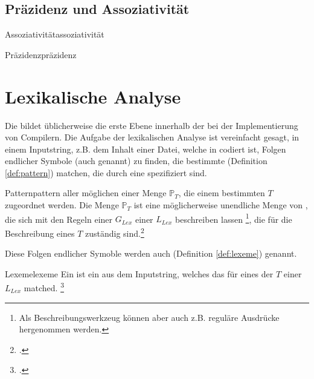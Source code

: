 \subsection{Präzidenz und Assoziativität}
\begin{Definition}{Assoziativität}{assoziativität}
\end{Definition}
\begin{Definition}{Präzidenz}{präzidenz}
\end{Definition}
\section{Lexikalische Analyse}
\label{sec:lexikalische_analyse}

Die  bildet üblicherweise die erste Ebene innerhalb der  bei der Implementierung von Compilern. Die Aufgabe der lexikalischen Analyse ist vereinfacht gesagt, in einem Inputstring, z.B. dem Inhalt einer Datei, welche in  codiert ist, Folgen endlicher Symbole (auch  genannt) zu finden, die bestimmte  (Definition \ref{def:pattern}) matchen, die durch eine  spezifiziert sind.

\begin{Definition}{Pattern}{pattern}
   aller möglichen  einer Menge $\mathbb{P}_{T}$, die einem bestimmten  $T$ zugeordnet werden.
  Die Menge $\mathbb{P}_{T}$ ist eine möglicherweise unendliche Menge von , die sich mit den Regeln einer  ${G}_{Lex}$ einer  ${L}_{Lex}$ beschreiben lassen \footnote{Als Beschreibungswerkzeug können aber auch z.B. reguläre Ausdrücke hergenommen werden.}, die für die Beschreibung eines  $T$ zuständig sind.\footcite{noauthor_what_nodate}
\end{Definition}

Diese Folgen endlicher Symoble werden auch  (Definition \ref{def:lexeme}) genannt.

\begin{Definition}{Lexeme}{lexeme}
  Ein  ist ein  aus dem Inputstring, welches das  für eines der  $T$ einer  ${L}_{Lex}$ matched.
\footcite{noauthor_what_nodate}
\end{Definition}

